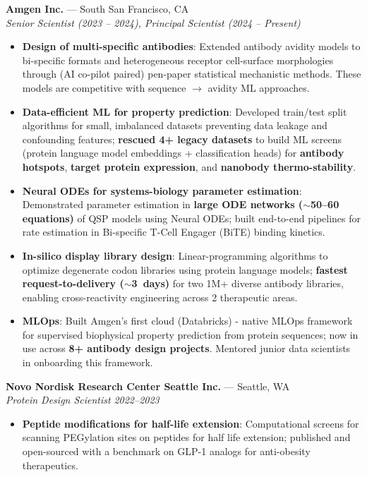 \documentclass[9pt, letterpaper]{article}
\newcommand{\employer}[1]{\textbf{\color{accent}#1}}
\newcommand{\jobtitle}[1]{\textit{#1}}
\newcommand{\daterange}[1]{\textit{\color{muted}#1}}
\newcommand{\jobheader}[3]{%
  \employer{#1} --- \textcolor{muted}{#2} \\[2pt]
  #3\par
}
\newcommand{\roletime}[2]{%
  \jobtitle{#1} \hfill \daterange{#2}\par\vspace{1pt}
}
\begin{document}
{\jobheader{Amgen Inc.}{South San Francisco, CA}{%
  \jobtitle{Senior Scientist (2023 -- 2024), Principal Scientist (2024 -- Present)} \par\vspace{1pt}
}
\begin{itemize}
  \item \textbf{Design of multi-specific antibodies}: Extended antibody avidity models to bi-specific formats and heterogeneous receptor cell-surface morphologies through (AI co-pilot paired) pen-paper statistical mechanistic methods. These models are competitive with sequence $\to$ avidity ML approaches.

  \item \textbf{Data-efficient ML for property prediction}: Developed train/test split algorithms for small, imbalanced datasets preventing data leakage and confounding features; \textbf{rescued 4+ legacy datasets} to build ML screens (protein language model embeddings + classification heads) for \textbf{antibody hotspots}, \textbf{target protein expression}, and \textbf{nanobody thermo-stability}.

  \item \textbf{Neural ODEs for systems-biology parameter estimation}: Demonstrated parameter estimation in \textbf{large ODE networks (${\sim}$50--60 equations)} of QSP models using Neural ODEs; built end-to-end pipelines for rate estimation in Bi-specific T-Cell Engager (BiTE) binding kinetics.

  \item \textbf{In-silico display library design}: Linear-programming algorithms to optimize degenerate codon libraries using protein language models; \textbf{fastest request-to-delivery (${\sim}$3~days)} for two 1M+ diverse antibody libraries, enabling cross-reactivity engineering across 2 therapeutic areas.

  \item \textbf{MLOps}: Built Amgen's first cloud (Databricks) - native MLOps framework for supervised biophysical property prediction from protein sequences; now in use across \textbf{8+ antibody design projects}. Mentored junior data scientists in onboarding this framework.
\end{itemize}

\vspace{6pt}
\jobheader{Novo Nordisk Research Center Seattle Inc.}{Seattle, WA}{%
  \roletime{Protein Design Scientist}{2022--2023}
}
\begin{itemize}
  \item \textbf{Peptide modifications for half-life extension}: Computational screens for scanning PEGylation sites on peptides for half life extension; published and open-sourced with a benchmark on GLP-1 analogs for anti-obesity therapeutics.


\end{itemize}}
\end{document}
